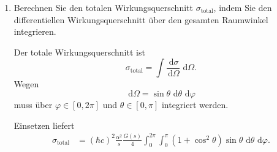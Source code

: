\documentclass[11pt,a4paper]{scrartcl}
\newcommand{\dd}{\,\mathrm{d}}
\begin{document}
\begin{enumerate}[label=(\alph*)]
\begin{calculationbox}
                \begin{calculationbox}
                    Beim Rutherfordstreuquerschnitt gilt dagegen qualitativ
                    \[
                        \frac{\dd\sigma_R}{\dd\Omega}\propto \frac{1}{\sin^4(\theta/2)}.
                    \]
                    Diese Winkelabhängigkeit ist stark nach vorne gerichtet und divergiert
                    für $\theta\to0$. Im Gegensatz dazu ist $1+\cos^2\theta$ überall endlich
                    und hat nur einen Faktor $2$ zwischen Minimum und Maximum.
                \end{calculationbox}
            \end{calculationbox}

            \begin{answerbox}
                Die Winkelabhängigkeit der $e^+e^-\to \mu^+\mu^-$-Reaktion ist glatt,
                endlich und vorwärts-rückwärts-symmetrisch:
                \[
                    \boxed{\frac{\dd\sigma}{\dd\Omega}\propto 1+\cos^2\theta.}
                \]
                Rutherfordstreuung ist dagegen stark vorwärtsdominant und besitzt eine
                Divergenz für kleine Streuwinkel.
            \end{answerbox}

        \item
            Berechnen Sie den totalen Wirkungsquerschnitt $\sigma_{\mathrm{total}}$,
            indem Sie den differentiellen Wirkungsquerschnitt über den gesamten Raumwinkel integrieren.

            \begin{calculationbox}
                Der totale Wirkungsquerschnitt ist
                \[
                    \sigma_{\mathrm{total}}
                    =\int \frac{\dd\sigma}{\dd\Omega}\,\dd\Omega.
                \]
                Wegen
                \[
                    \dd\Omega=\sin\theta\,\dd\theta\,\dd\varphi
                \]
                muss über $\varphi\in[0,2\pi]$ und $\theta\in[0,\pi]$ integriert werden.

                \begin{calculationbox}
                    Einsetzen liefert
                    \begin{align*}
                        \sigma_{\mathrm{total}}
                        &=(\hbar c)^2\frac{\alpha^2}{s}\frac{G(s)}{4}
                        \int_0^{2\pi}\int_0^\pi
                        (1+\cos^2\theta)\sin\theta\,\dd\theta\,\dd\varphi.
                    \end{align*}
                \end{calculationbox}


\end{calculationbox}
\end{enumerate}
\end{document}
